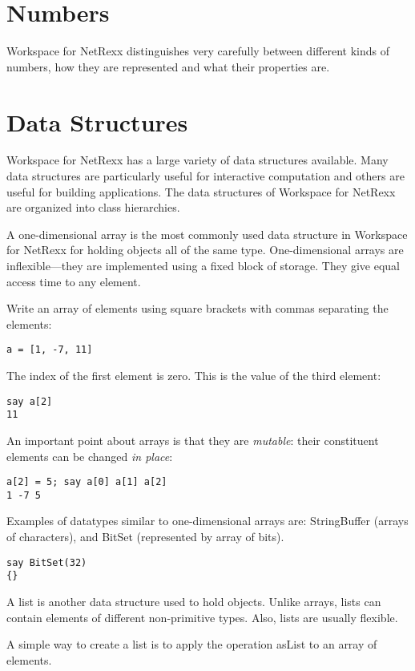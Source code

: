  \section{Numbers}

Workspace for NetRexx distinguishes very carefully between different kinds of numbers, how they are represented and what their properties are.

 \section{Data Structures}

Workspace for NetRexx has a large variety of data structures available. Many data structures are particularly useful for interactive computation and others are useful for building applications. The data structures of Workspace for NetRexx are organized into class hierarchies.

A one-dimensional array is the most commonly used data structure in Workspace for NetRexx for holding objects all of the same type. One-dimensional arrays are inflexible---they are implemented using a fixed block of storage. They give equal access time to any element.

Write an array of elements using square brackets with commas separating the elements:
\begin{verbatim}
a = [1, -7, 11]
\end{verbatim}
The index of the first element is zero. This is the value of the third element:

\begin{verbatim}
say a[2]
11
\end{verbatim}
An important point about arrays is that they are \emph{mutable}: their constituent elements can be changed \emph{in place}:

\begin{verbatim}
a[2] = 5; say a[0] a[1] a[2]
1 -7 5
\end{verbatim}
Examples of datatypes similar to one-dimensional arrays are: StringBuffer (arrays of characters), and BitSet (represented by array of bits).

\begin{verbatim}
say BitSet(32)
{}
\end{verbatim}
A list is another data structure used to hold objects. Unlike arrays, lists can contain elements of different non-primitive types. Also, lists are usually flexible.

A simple way to create a list is to apply the operation asList to an array of elements.

